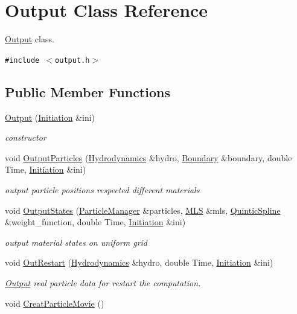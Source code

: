 \hypertarget{classOutput}{
\section{Output Class Reference}
\label{classOutput}
}
\hyperlink{classOutput}{Output} class.  


{\tt \#include $<$output.h$>$}

\subsection*{Public Member Functions}
\begin{CompactItemize}
\item 
\hyperlink{classOutput_2bd84635e13bedd1b8417fd39062a767}{Output} (\hyperlink{classInitiation}{Initiation} \&ini)
\begin{CompactList}\small\item\em constructor \item\end{CompactList}\item 
void \hyperlink{classOutput_f9e8b1a0aa456c01c69f7b3c7ee2649a}{OutputParticles} (\hyperlink{classHydrodynamics}{Hydrodynamics} \&hydro, \hyperlink{classBoundary}{Boundary} \&boundary, double Time, \hyperlink{classInitiation}{Initiation} \&ini)
\begin{CompactList}\small\item\em output particle positions respected different materials \item\end{CompactList}\item 
void \hyperlink{classOutput_2b41cacb61eecf10cbaca6bebb3e6316}{OutputStates} (\hyperlink{classParticleManager}{ParticleManager} \&particles, \hyperlink{classMLS}{MLS} \&mls, \hyperlink{classQuinticSpline}{QuinticSpline} \&weight\_\-function, double Time, \hyperlink{classInitiation}{Initiation} \&ini)
\begin{CompactList}\small\item\em output material states on uniform grid \item\end{CompactList}\item 
void \hyperlink{classOutput_a96aad43762590fc7779d24050c0a151}{OutRestart} (\hyperlink{classHydrodynamics}{Hydrodynamics} \&hydro, double Time, \hyperlink{classInitiation}{Initiation} \&ini)
\begin{CompactList}\small\item\em \hyperlink{classOutput}{Output} real particle data for restart the computation. \item\end{CompactList}\item 
\hypertarget{classOutput_16c4f8bae53fec90a812e5d479ae822d}{
void \hyperlink{classOutput_16c4f8bae53fec90a812e5d479ae822d}{CreatParticleMovie} ()}
\label{classOutput_16c4f8bae53fec90a812e5d479ae822d}


\end{CompactItemize}
